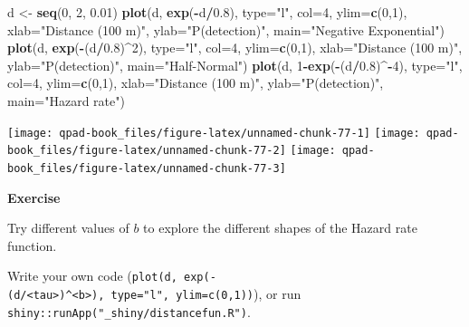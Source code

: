 \documentclass[12pt,]{book}
\newenvironment{Shaded}{\begin{snugshade}}{\end{snugshade}}
\newcommand{\DataTypeTok}[1]{\textcolor[rgb]{0.13,0.29,0.53}{#1}}
\newcommand{\DecValTok}[1]{\textcolor[rgb]{0.00,0.00,0.81}{#1}}
\newcommand{\FloatTok}[1]{\textcolor[rgb]{0.00,0.00,0.81}{#1}}
\newcommand{\KeywordTok}[1]{\textcolor[rgb]{0.13,0.29,0.53}{\textbf{#1}}}
\newcommand{\NormalTok}[1]{#1}
\newcommand{\OperatorTok}[1]{\textcolor[rgb]{0.81,0.36,0.00}{\textbf{#1}}}
\newcommand{\StringTok}[1]{\textcolor[rgb]{0.31,0.60,0.02}{#1}}
\let\BeginKnitrBlock\begin \let\EndKnitrBlock\end
\begin{document}
\begin{Shaded}
\begin{Highlighting}[]
\NormalTok{d <-}\StringTok{ }\KeywordTok{seq}\NormalTok{(}\DecValTok{0}\NormalTok{, }\DecValTok{2}\NormalTok{, }\FloatTok{0.01}\NormalTok{)}
\KeywordTok{plot}\NormalTok{(d, }\KeywordTok{exp}\NormalTok{(}\OperatorTok{-}\NormalTok{d}\OperatorTok{/}\FloatTok{0.8}\NormalTok{), }\DataTypeTok{type=}\StringTok{"l"}\NormalTok{, }\DataTypeTok{col=}\DecValTok{4}\NormalTok{, }\DataTypeTok{ylim=}\KeywordTok{c}\NormalTok{(}\DecValTok{0}\NormalTok{,}\DecValTok{1}\NormalTok{),}
  \DataTypeTok{xlab=}\StringTok{"Distance (100 m)"}\NormalTok{, }\DataTypeTok{ylab=}\StringTok{"P(detection)"}\NormalTok{, }\DataTypeTok{main=}\StringTok{"Negative Exponential"}\NormalTok{)}
\KeywordTok{plot}\NormalTok{(d, }\KeywordTok{exp}\NormalTok{(}\OperatorTok{-}\NormalTok{(d}\OperatorTok{/}\FloatTok{0.8}\NormalTok{)}\OperatorTok{^}\DecValTok{2}\NormalTok{), }\DataTypeTok{type=}\StringTok{"l"}\NormalTok{, }\DataTypeTok{col=}\DecValTok{4}\NormalTok{, }\DataTypeTok{ylim=}\KeywordTok{c}\NormalTok{(}\DecValTok{0}\NormalTok{,}\DecValTok{1}\NormalTok{),}
  \DataTypeTok{xlab=}\StringTok{"Distance (100 m)"}\NormalTok{, }\DataTypeTok{ylab=}\StringTok{"P(detection)"}\NormalTok{, }\DataTypeTok{main=}\StringTok{"Half-Normal"}\NormalTok{)}
\KeywordTok{plot}\NormalTok{(d, }\DecValTok{1}\OperatorTok{-}\KeywordTok{exp}\NormalTok{(}\OperatorTok{-}\NormalTok{(d}\OperatorTok{/}\FloatTok{0.8}\NormalTok{)}\OperatorTok{^-}\DecValTok{4}\NormalTok{), }\DataTypeTok{type=}\StringTok{"l"}\NormalTok{, }\DataTypeTok{col=}\DecValTok{4}\NormalTok{, }\DataTypeTok{ylim=}\KeywordTok{c}\NormalTok{(}\DecValTok{0}\NormalTok{,}\DecValTok{1}\NormalTok{),}
  \DataTypeTok{xlab=}\StringTok{"Distance (100 m)"}\NormalTok{, }\DataTypeTok{ylab=}\StringTok{"P(detection)"}\NormalTok{, }\DataTypeTok{main=}\StringTok{"Hazard rate"}\NormalTok{)}
\end{Highlighting}
\end{Shaded}

\texttt{[image: qpad-book\_files/figure-latex/unnamed-chunk-77-1]} \texttt{[image: qpad-book\_files/figure-latex/unnamed-chunk-77-2]} \texttt{[image: qpad-book\_files/figure-latex/unnamed-chunk-77-3]}

\BeginKnitrBlock{rmdexercise}
\textbf{Exercise}

Try different values of \(b\) to explore the different shapes of the Hazard rate function.

Write your own code (\texttt{plot(d,\ exp(-(d/\textless{}tau\textgreater{})\^{}\textless{}b\textgreater{}),\ type="l",\ ylim=c(0,1))}), or run \texttt{shiny::runApp("\_shiny/distancefun.R")}.
\EndKnitrBlock{rmdexercise}
\end{document}
